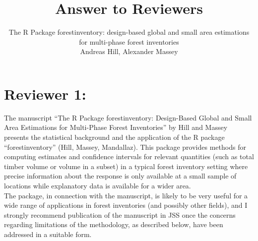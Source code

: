 \documentclass{article}
\title{Answer to Reviewers}
\author{The R Package forestinventory: design-based global and small area estimations for multi-phase forest inventories\\
Andreas Hill, Alexander Massey}
\begin{document}

\maketitle
\thispagestyle{empty}
\newpage

\setcounter{page}{1}

\pagestyle{fancy} %
\fancyfoot[C]{\thepage}
\setlength{\headsep}{15mm}

\newcommand{\answer}[1]{\small \color{mybrown}{#1} \color{black}}
\newcommand{\note}[1]{\textit{\small \color{amaranth} \textbf{Note:} #1} \color{black}}
\newcommand{\todo}[1]{\color{red}{#1} \color{black}}
\newcommand{\answerfin}[1]{\small \color{mygreen}{#1} \color{black}}



\section*{Reviewer 1:}

The manuscript “The R Package forestinventory: Design-Based Global and Small Area Estimations for Multi-Phase Forest Inventories” by Hill and Massey presents the statistical background and the application of the R package “forestinventory” (Hill, Massey, Mandallaz). This package provides methods for computing estimates and confidence intervals for relevant quantities (such as total timber volume or volume in a subset) in a typical forest inventory setting where precise information about the response is only available at a small sample of locations while explanatory data is available for a wider area.\\

The package, in connection with the manuscript, is likely to be very useful for a wide range of applications in forest inventories (and possibly other fields), and I strongly recommend publication of the manuscript in JSS once the concerns regarding limitations of the methodology, as described below, have been addressed in a suitable form.\\
\end{document}
